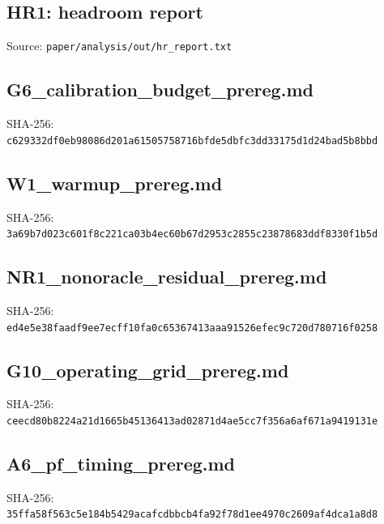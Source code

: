 \documentclass[10pt]{article}
\begin{document}
\begin{landscape}
\subsection*{HR1: headroom report}
\noindent Source: \texttt{paper/analysis/out/hr\_report.txt}\par
{}
\end{landscape}
\clearpage
\subsection*{G6\_calibration\_budget\_prereg.md}
\noindent SHA-256: \texttt{\footnotesize c629332df0eb98086d201a61505758716bfde5dbfc3dd33175d1d24bad5b8bbd}\par\medskip

\clearpage
\subsection*{W1\_warmup\_prereg.md}
\noindent SHA-256: \texttt{\footnotesize 3a69b7d023c601f8c221ca03b4ec60b67d2953c2855c23878683ddf8330f1b5d}\par\medskip

\clearpage
\subsection*{NR1\_nonoracle\_residual\_prereg.md}
\noindent SHA-256: \texttt{\footnotesize ed4e5e38faadf9ee7ecff10fa0c65367413aaa91526efec9c720d780716f0258}\par\medskip

\clearpage
\subsection*{G10\_operating\_grid\_prereg.md}
\noindent SHA-256: \texttt{\footnotesize ceecd80b8224a21d1665b45136413ad02871d4ae5cc7f356a6af671a9419131e}\par\medskip

\clearpage
\subsection*{A6\_pf\_timing\_prereg.md}
\noindent SHA-256: \texttt{\footnotesize 35ffa58f563c5e184b5429acafcdbbcb4fa92f78d1ee4970c2609af4dca1a8d8}\par\medskip

\clearpage
\end{document}
